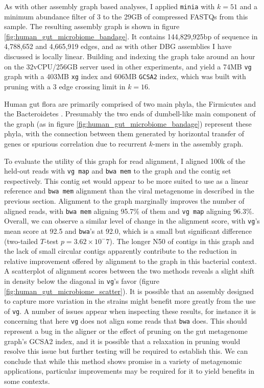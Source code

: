 As with other assembly graph based analyses, I applied {\tt minia} with $k=51$ and a minimum abundance filter of 3 to the 29GB of compressed FASTQs from this sample.
The resulting assembly graph is shown in figure \ref{fig:human_gut_microbiome_bandage}.
It contains 144,829,925bp of sequence in 4,788,652 and 4,665,919 edges, and as with other DBG assemblies I have discussed is locally linear.
Building and indexing the graph take around an hour on the 32vCPU/256GB server used in other experiments, and yield a 74MB {\tt vg} graph with a 403MB {\tt xg} index and 606MB {\tt GCSA2} index, which was built with pruning with a 3 edge crossing limit in $k=16$.

Human gut flora are primarily comprised of two main phyla, the Firmicutes and the Bacteroidetes \cite{mahowald2009characterizing}.
Presumably the two ends of dumbell-like main component of the graph (as in figure \ref{fig:human_gut_microbiome_bandage}) represent these phyla, with the connection between them generated by horizontal transfer of genes or spurious correlation due to recurrent $k$-mers in the assembly graph.

To evaluate the utility of this graph for read alignment, I aligned 100k of the held-out reads with {\tt vg map} and {\tt bwa mem} to the graph and the contig set respectively.
This contig set would appear to be more suited to use as a linear reference and {\tt bwa mem} alignment than the viral metagenome in described in the previous section.
Alignment to the graph marginally improves the number of aligned reads, with {\tt bwa mem} aligning 95.7\% of them and {\tt vg map} aligning 96.3\%.
Overall, we can observe a similar level of change in the alignment score, with {\tt vg}'s mean score at 92.5 and {\tt bwa}'s at 92.0, which is a small but significant difference (two-tailed $T$-test $p=3.62\times 10^-7$).
The longer N50 of contigs in this graph and the lack of small circular contigs apparently contribute to the reduction in relative improvement offered by alignment to the graph in this bacterial context.
A scatterplot of alignment scores between the two methods reveals a slight shift in density below the diagonal in {\tt vg}'s favor (figure \ref{fig:human_gut_microbiome_scatter}).
It is possible that an assembly designed to capture more variation in the strains might benefit more greatly from the use of {\tt vg}.
A number of issues appear when inspecting these results, for instance it is concerning that here {\tt vg} does not align some reads that {\tt bwa} does.
This should represent a bug in the aligner or the effect of pruning on the gut metagenome graph's GCSA2 index, and it is possible that a relaxation in pruning would resolve this issue but further testing will be required to establish this.
We can conclude that while this method shows promise in a variety of metagenomic applications, particular improvements may be required for it to yield benefits in some contexts.

